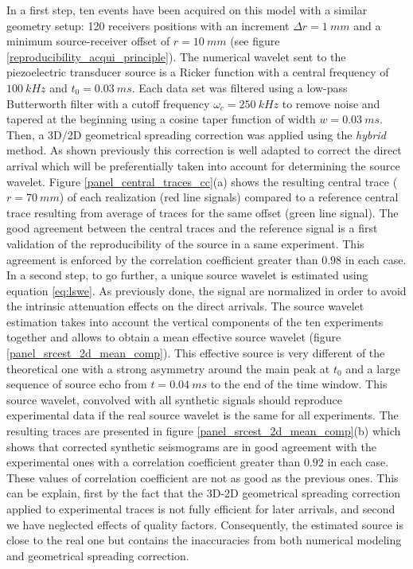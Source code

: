 \documentclass[manuscript,revised]{geophysics}
\begin{document}
\noindent In a first step, ten events have been acquired on this model with a similar geometry setup: 120 receivers positions with an increment $\Delta r= 1\ mm$ and a minimum source-receiver offset of $r=10\ mm$ (see figure \ref{reproducibility_acqui_principle}). The numerical wavelet sent to the piezoelectric transducer source is a Ricker function with a central frequency of $100\ kHz$ and $t_{0}=0.03\ ms$. Each data set was filtered using a low-pass Butterworth filter with a cutoff frequency $\omega_{c}=250\ kHz$ to remove noise and tapered at the beginning using a cosine taper function of width $w=0.03\ ms$. Then, a 3D/2D geometrical spreading correction was applied using the \textit{hybrid} method. As shown previously this correction is well adapted to correct the direct arrival which will be preferentially taken into account for determining the source wavelet. Figure \ref{panel_central_traces_cc}(a) shows the resulting central trace ($r=70\ mm$) of each realization (red line signals) compared to a reference central trace resulting from average of traces for the same offset (green line signal). The good agreement between the central traces and the reference signal is a first validation of the reproducibility of the source in a same experiment. This agreement is enforced by the correlation coefficient greater than $0.98$ in each case. In a second step, to go further, a unique source wavelet is estimated using equation \ref{eq:lswe}. As previously done, the signal are normalized in order to avoid the intrinsic attenuation effects on the direct arrivals. The source wavelet estimation takes into account the vertical components of the ten experiments together and allows to obtain a mean effective source wavelet (figure \ref{panel_srcest_2d_mean_comp}). This effective source is very different of the theoretical one with a strong asymmetry around the main peak at $t_{0}$ and a large sequence of source echo from $t=0.04\ ms$ to the end of the time window. This source wavelet, convolved with all synthetic signals should reproduce experimental data if the real source wavelet is the same for all experiments. The resulting traces are presented in figure \ref{panel_srcest_2d_mean_comp}(b) which shows that corrected synthetic seismograms are in good agreement with the experimental ones with a correlation coefficient greater than $0.92$ in each case. These values of correlation coefficient are not as good as the previous ones. This can be explain, first by the fact that the 3D-2D geometrical spreading correction applied to experimental traces is not fully efficient for later arrivals, and second we have neglected effects of quality factors. Consequently, the estimated source is close to the real one but contains the inaccuracies from both numerical modeling and geometrical spreading correction.   
\end{document}
